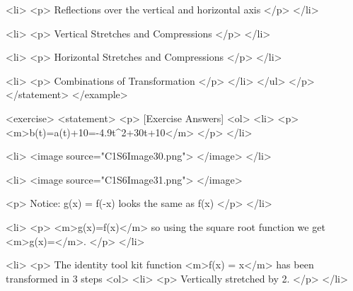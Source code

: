                         <li>
                            <p>
                                Reflections over the vertical and horizontal axis
                            </p>
                        </li>

                        <li>
                            <p>
                                Vertical Stretches and Compressions
                            </p>
                        </li>

                        <li>
                            <p>
                                Horizontal Stretches and Compressions
                            </p>
                        </li>

                        <li>
                            <p>
                                Combinations of Transformation
                            </p>
                        </li>
                    </ul>
                </p>
            </statement>
        </example>

        <exercise>
            <statement>
                <p>
                    [Exercise Answers]
                    <ol>
                        <li>
                            <p>
                                <m>b(t)=a(t)+10=-4.9t^{2}+30t+10</m>
                            </p>
                        </li>

                        <li>
                            <image source="C1S6Image30.png">
                            </image>
                        </li>

                        <li>
                            <image source="C1S6Image31.png">
                            </image>

                            <p>
                                Notice: g(x) = f(-x) looks the same as f(x)
                            </p>
                        </li>

                        <li>
                            <p>
                                <m>g(x)=f(x)</m> so using the square root function we get <m>g(x)=</m>.
                            </p>
                        </li>

                        <li>
                            <p>
                                The identity tool kit function <m>f(x) = x</m> has been transformed in 3 steps
                                <ol>
                                    <li>
                                        <p>
                                            Vertically stretched by 2.
                                        </p>
                                    </li>

